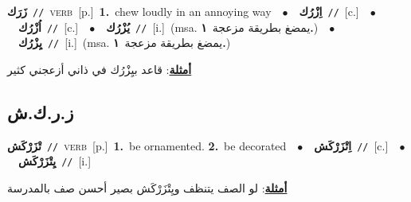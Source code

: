 \documentclass[10pt,a4paper,twoside]{article} %
\begin{document}
\begin{multicols}{2}
{\setlength\topsep{0pt}\textbf{\foreignlanguage{arabic}{زَرَك}}\ {\color{gray}\texttt{//}\color{black}}\ \textsc{verb}\ [p.]\ \textbf{1.}~chew loudly in an annoying way\ \ $\bullet$\ \ \setlength\topsep{0pt}\textbf{\foreignlanguage{arabic}{اِزْرُك}}\ {\color{gray}\texttt{//}\color{black}}\ [c.]\ \ $\bullet$\ \ \setlength\topsep{0pt}\textbf{\foreignlanguage{arabic}{اُزْرُك}}\ {\color{gray}\texttt{//}\color{black}}\ [c.]\ \ $\bullet$\ \ \setlength\topsep{0pt}\textbf{\foreignlanguage{arabic}{يُزْرُك}}\ {\color{gray}\texttt{//}\color{black}}\ [i.]\ \color{gray}(msa. \foreignlanguage{arabic}{يمضغ بطريقة مزعجة}~\foreignlanguage{arabic}{\textbf{١.}})\color{black}\ \ $\bullet$\ \ \setlength\topsep{0pt}\textbf{\foreignlanguage{arabic}{يِزْرُك}}\ {\color{gray}\texttt{//}\color{black}}\ [i.]\ \color{gray}(msa. \foreignlanguage{arabic}{يمضغ بطريقة مزعجة}~\foreignlanguage{arabic}{\textbf{١.}})\color{black}\  \begin{flushright}\color{gray}\foreignlanguage{arabic}{\textbf{\underline{\foreignlanguage{arabic}{أمثلة}}}: قاعد بيِزْرُك في ذاني أزعجني كثير}\end{flushright}\color{black}} \vspace{2mm}

\vspace{-3mm}
\subsection*{\color{blue}\foreignlanguage{arabic}{ز.ر.ك.ش}\color{blue}{}} 

{\setlength\topsep{0pt}\textbf{\foreignlanguage{arabic}{تْزَرْكَش}}\ {\color{gray}\texttt{//}\color{black}}\ \textsc{verb}\ [p.]\ \textbf{1.}~be ornamented.  \textbf{2.}~be decorated\ \ $\bullet$\ \ \setlength\topsep{0pt}\textbf{\foreignlanguage{arabic}{اِتْزَرْكَش}}\ {\color{gray}\texttt{//}\color{black}}\ [c.]\ \ $\bullet$\ \ \setlength\topsep{0pt}\textbf{\foreignlanguage{arabic}{يِتْزَرْكَش}}\ {\color{gray}\texttt{//}\color{black}}\ [i.]\  \begin{flushright}\color{gray}\foreignlanguage{arabic}{\textbf{\underline{\foreignlanguage{arabic}{أمثلة}}}: لو الصف يتنظف ويِتْزَرْكَش بصير أحسن صف بالمدرسة}\end{flushright}\color{black}} \vspace{2mm}


\end{multicols}
\end{document}
